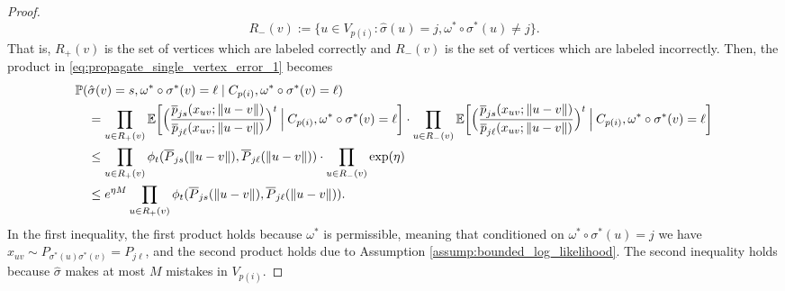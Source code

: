 \documentclass{article}
\renewcommand{\P}{\mathbb{P}}
\newcommand{\E}{\mathbb{E}}
\newcommand{\1}{\mathbbm{1}}
\theoremstyle{definition}
\theoremstyle{plain}
\begin{document}
\begin{proof}
\begin{equation*}
    R_-(v) := \{u \in V_{p(i)}: \hat{\sigma}(u) = j, \omega^* \circ \sigma^*(u) \neq j\}.
\end{equation*}
That is, $R_+(v)$ is the set of vertices which are labeled correctly and $R_-(v)$ is the set of vertices which are labeled incorrectly. Then, the product in \eqref{eq:propagate_single_vertex_error_1} becomes
\begin{align}
\label{eq:propagate_single_vertex_error_2}
    &\P(\hat{\sigma}(v) = s, \omega^* \circ \sigma^*(v) = \ell \mid C_{p(i)}, \omega^* \circ \sigma^*(v) = \ell) \notag \\
    &\quad= \prod_{u \in R_+(v)} \E\bigg[ \Big(\frac{\overline{p}_{js}(x_{uv};\|u-v\|)}{\overline{p}_{j\ell}(x_{uv};\|u-v\|)}\Big)^t \: \Big| \: C_{p(i)}, \omega^* \circ \sigma^*(v) = \ell \bigg] \cdot \prod_{u \in R_-(v)} \E\bigg[ \Big(\frac{\overline{p}_{js}(x_{uv};\|u-v\|)}{\overline{p}_{j\ell}(x_{uv};\|u-v\|)}\Big)^t \: \Big| \: C_{p(i)}, \omega^* \circ \sigma^*(v) = \ell \bigg] \notag \\ 
    &\quad\leq \prod_{u \in R_+(v)} \phi_t(\overline{P}_{js}(\|u-v\|), \overline{P}_{j\ell}(\|u-v\|)) \cdot \prod_{u \in R_-(v)} \exp(\eta) \notag \\
    &\quad\leq e^{\eta M} \prod_{u \in R_+(v)} \phi_t(\overline{P}_{js}(\|u-v\|), \overline{P}_{j\ell}(\|u-v\|)).
\end{align}
In the first inequality, the first product holds because $\omega^*$ is permissible, meaning that conditioned on $\omega^* \circ \sigma^*(u) = j$ we have $x_{uv} \sim P_{\sigma^*(u)\sigma^*(v)} = P_{j\ell}$, and the second product holds due to Assumption \ref{assump:bounded_log_likelihood}. The second inequality holds because $\hat{\sigma}$ makes at most $M$ mistakes in $V_{p(i)}$.


\end{proof}
\end{document}
